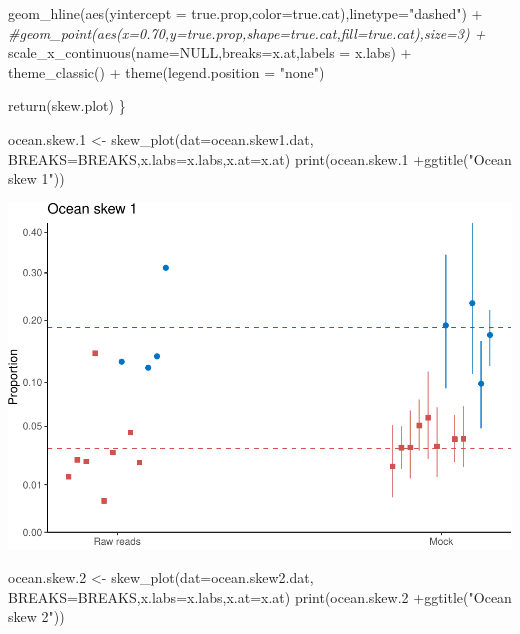 \documentclass[
]{article}
\newenvironment{Shaded}{\begin{snugshade}}{\end{snugshade}}
\newcommand{\AttributeTok}[1]{\textcolor[rgb]{0.77,0.63,0.00}{#1}}
\newcommand{\CommentTok}[1]{\textcolor[rgb]{0.56,0.35,0.01}{\textit{#1}}}
\newcommand{\ConstantTok}[1]{\textcolor[rgb]{0.00,0.00,0.00}{#1}}
\newcommand{\FloatTok}[1]{\textcolor[rgb]{0.00,0.00,0.81}{#1}}
\newcommand{\FunctionTok}[1]{\textcolor[rgb]{0.00,0.00,0.00}{#1}}
\newcommand{\NormalTok}[1]{#1}
\newcommand{\OtherTok}[1]{\textcolor[rgb]{0.56,0.35,0.01}{#1}}
\newcommand{\SpecialCharTok}[1]{\textcolor[rgb]{0.00,0.00,0.00}{#1}}
\newcommand{\StringTok}[1]{\textcolor[rgb]{0.31,0.60,0.02}{#1}}
\begin{document}
\begin{Shaded}
\begin{Highlighting}[]
    \FunctionTok{geom\_hline}\NormalTok{(}\FunctionTok{aes}\NormalTok{(}\AttributeTok{yintercept =}\NormalTok{ true.prop,}\AttributeTok{color=}\NormalTok{true.cat),}\AttributeTok{linetype=}\StringTok{"dashed"}\NormalTok{) }\SpecialCharTok{+}
    \CommentTok{\#geom\_point(aes(x=0.70,y=true.prop,shape=true.cat,fill=true.cat),size=3) +}
    \FunctionTok{scale\_x\_continuous}\NormalTok{(}\AttributeTok{name=}\ConstantTok{NULL}\NormalTok{,}\AttributeTok{breaks=}\NormalTok{x.at,}\AttributeTok{labels =}\NormalTok{ x.labs) }\SpecialCharTok{+}
    \FunctionTok{theme\_classic}\NormalTok{() }\SpecialCharTok{+}
    \FunctionTok{theme}\NormalTok{(}\AttributeTok{legend.position =} \StringTok{"none"}\NormalTok{)}
  
  \FunctionTok{return}\NormalTok{(skew.plot)}
\NormalTok{\}}


\NormalTok{ocean.skew}\FloatTok{.1} \OtherTok{\textless{}{-}} \FunctionTok{skew\_plot}\NormalTok{(}\AttributeTok{dat=}\NormalTok{ocean.skew1.dat,}
                          \AttributeTok{BREAKS=}\NormalTok{BREAKS,}\AttributeTok{x.labs=}\NormalTok{x.labs,}\AttributeTok{x.at=}\NormalTok{x.at) }
\FunctionTok{print}\NormalTok{(ocean.skew}\FloatTok{.1}  \SpecialCharTok{+}\FunctionTok{ggtitle}\NormalTok{(}\StringTok{"Ocean skew 1"}\NormalTok{))                }
\end{Highlighting}
\end{Shaded}

\includegraphics{Appendix_S4_files/figure-latex/stan_plotting_bayes-1.pdf}

\begin{Shaded}
\begin{Highlighting}[]
\NormalTok{ocean.skew}\FloatTok{.2} \OtherTok{\textless{}{-}} \FunctionTok{skew\_plot}\NormalTok{(}\AttributeTok{dat=}\NormalTok{ocean.skew2.dat,}
                          \AttributeTok{BREAKS=}\NormalTok{BREAKS,}\AttributeTok{x.labs=}\NormalTok{x.labs,}\AttributeTok{x.at=}\NormalTok{x.at) }
\FunctionTok{print}\NormalTok{(ocean.skew}\FloatTok{.2} \SpecialCharTok{+}\FunctionTok{ggtitle}\NormalTok{(}\StringTok{"Ocean skew 2"}\NormalTok{))}
\end{Highlighting}
\end{Shaded}
\end{document}
